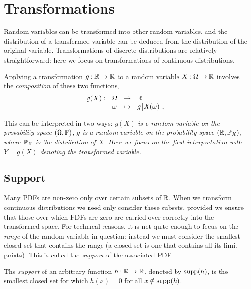 
\section{Transformations}\label{sec:transfs}

Random variables can be transformed into other random variables, and the distribution of a transformed variable can be deduced from the distribution of the original variable. Transformations of discrete distributions are relatively straightforward: here we focus on transformations of continuous distributions.

Applying a transformation $g:\mathbb{R}\to\mathbb{R}$ to a random variable $X:\Omega\to\mathbb{R}$ involves the \emph{composition} of these two functions,
\[
\begin{array}{rlcl}
g(X) : 	& \Omega & \to 		& \mathbb{R} \\
		& \omega & \mapsto	& g\big[X(\omega)\big],
\end{array}
\]

This can be interpreted in two ways:
\ben 
\it $g(X)$ is a random variable on the probability space $(\Omega,\mathbb{P})$;
\it $g$ is a random variable on the probability space $(\mathbb{R},\mathbb{P}_X)$,
\een
where $\mathbb{P}_X$ is the distribution of $X$. Here we focus on the first interpretation with $Y=g(X)$ denoting the transformed variable.

\subsection{Support}
Many PDFs are non-zero only over certain subsets of $\mathbb{R}$. When we transform continuous distributions we need only consider these subsets, provided we ensure that those over which PDFs are zero are carried over correctly into the transformed space. For technical reasons, it is not quite enough to focus on the \emph{range} of the random variable in question: instead we must consider the smallest closed set that contains the range (a closed set is one that contains all its limit points). This is called the \emph{support} of the associated PDF.

\begin{definition}
The \emph{support} of an arbitrary function $h:\mathbb{R}\to\mathbb{R}$, denoted by $\text{supp}(h)$, is the smallest closed set for which $h(x)=0$ for all $x\notin\text{supp}(h)$. 
\end{definition}

